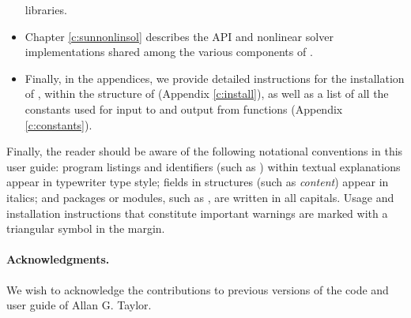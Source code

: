 \begin{itemize}
  libraries.
\item
  Chapter \ref{c:sunnonlinsol} describes the {\sunnonlinsol} API and nonlinear
  solver implementations shared among the various components of {\sundials}.
\item
  Finally, in the appendices, we provide detailed instructions for the installation
  of {\ida}, within the structure of {\sundials} (Appendix \ref{c:install}), as well
  as a list of all the constants used for input to and output from {\ida} functions
  (Appendix \ref{c:constants}).
\end{itemize}

Finally, the reader should be aware of the following notational conventions
in this user guide:  program listings and identifiers (such as ) 
within textual explanations appear in typewriter type style; 
fields in {\CC} structures (such as {\em content}) appear in italics;
and packages or modules, such as {\idadls}, are written in all capitals. 
Usage and installation instructions that constitute important warnings
are marked with a triangular symbol {\warn} in the margin.

\paragraph{Acknowledgments.}
We wish to acknowledge the contributions to previous versions of the
{\ida} code and user guide of Allan G. Taylor.



